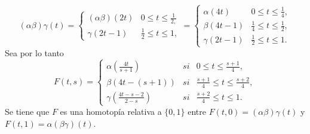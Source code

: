 \documentclass[bibtex, anon]{TEMat-article}
\begin{document}
\begin{demostracion}
\begin{enumerate}
		$$(\alpha\beta)\gamma(t)=\left\{\begin{array}{lc}
		(\alpha\beta)(2t) & 0\leq t\leq\frac{1}{2,}\\
		\gamma(2t-1) & \frac{1}{2}\leq t\leq 1,
		\end{array}\right.=\left\{\begin{array}{lc}
		\alpha(4t) & 0\leq t\leq\frac{1}{4},\\
		\beta(4t-1) & \frac{1}{4}\leq t\leq\frac{1}{2},\\
		\gamma(2t-1) & \frac{1}{2}\leq t\leq 1.
		\end{array}\right. $$
		Sea por lo tanto
		\[
		F(t,s)=\left\{\begin{array}{lcc}
		\alpha\left(\frac{4t}{s+1}\right) & si & 0\leq t\leq\frac{s+1}{4},\\
		\beta\left(4t-(s+1)\right) & si & \frac{s+1}{4}\leq t\leq\frac{s+2}{4},\\
		\gamma\left(\frac{4t-s-2}{2-s}\right) & si & \frac{s+2}{4}\leq t\leq 1.
		\end{array}\right.
		\]
		Se tiene que $F$ es una homotopía relativa a $\{0,1\}$ entre $F(t,0)=(\alpha\beta)\gamma(t)$ y $F(t,1)=\alpha(\beta\gamma)(t)$.
		

\end{enumerate}
\end{demostracion}
\end{document}
